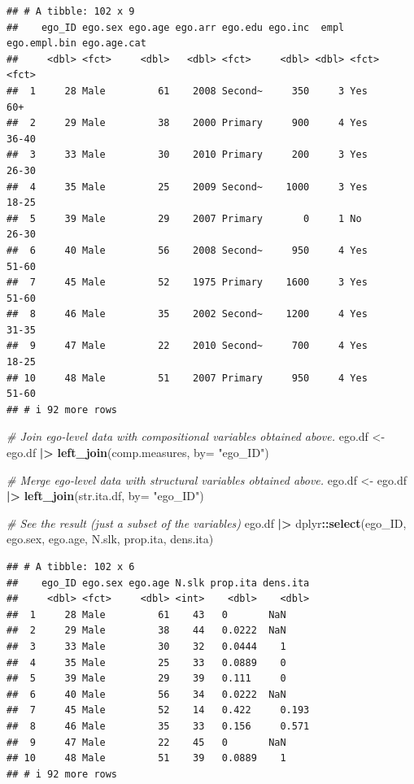 \documentclass[
]{book}
\newenvironment{Shaded}{\begin{snugshade}}{\end{snugshade}}
\newcommand{\AttributeTok}[1]{\textcolor[rgb]{0.13,0.29,0.53}{#1}}
\newcommand{\CommentTok}[1]{\textcolor[rgb]{0.56,0.35,0.01}{\textit{#1}}}
\newcommand{\FunctionTok}[1]{\textcolor[rgb]{0.13,0.29,0.53}{\textbf{#1}}}
\newcommand{\NormalTok}[1]{#1}
\newcommand{\OtherTok}[1]{\textcolor[rgb]{0.56,0.35,0.01}{#1}}
\newcommand{\SpecialCharTok}[1]{\textcolor[rgb]{0.81,0.36,0.00}{\textbf{#1}}}
\newcommand{\StringTok}[1]{\textcolor[rgb]{0.31,0.60,0.02}{#1}}
\begin{document}
\begin{verbatim}
## # A tibble: 102 x 9
##    ego_ID ego.sex ego.age ego.arr ego.edu ego.inc  empl ego.empl.bin ego.age.cat
##     <dbl> <fct>     <dbl>   <dbl> <fct>     <dbl> <dbl> <fct>        <fct>      
##  1     28 Male         61    2008 Second~     350     3 Yes          60+        
##  2     29 Male         38    2000 Primary     900     4 Yes          36-40      
##  3     33 Male         30    2010 Primary     200     3 Yes          26-30      
##  4     35 Male         25    2009 Second~    1000     3 Yes          18-25      
##  5     39 Male         29    2007 Primary       0     1 No           26-30      
##  6     40 Male         56    2008 Second~     950     4 Yes          51-60      
##  7     45 Male         52    1975 Primary    1600     3 Yes          51-60      
##  8     46 Male         35    2002 Second~    1200     4 Yes          31-35      
##  9     47 Male         22    2010 Second~     700     4 Yes          18-25      
## 10     48 Male         51    2007 Primary     950     4 Yes          51-60      
## # i 92 more rows
\end{verbatim}

\begin{Shaded}
\begin{Highlighting}[]
\CommentTok{\# Join ego{-}level data with compositional variables obtained above.}
\NormalTok{ego.df }\OtherTok{\textless{}{-}}\NormalTok{ ego.df }\SpecialCharTok{|\textgreater{}} 
  \FunctionTok{left\_join}\NormalTok{(comp.measures, }\AttributeTok{by=} \StringTok{"ego\_ID"}\NormalTok{)}

\CommentTok{\# Merge ego{-}level data with structural variables obtained above.}
\NormalTok{ego.df }\OtherTok{\textless{}{-}}\NormalTok{ ego.df }\SpecialCharTok{|\textgreater{}} 
  \FunctionTok{left\_join}\NormalTok{(str.ita.df, }\AttributeTok{by=} \StringTok{"ego\_ID"}\NormalTok{)}

\CommentTok{\# See the result (just a subset of the variables)}
\NormalTok{ego.df }\SpecialCharTok{|\textgreater{}} 
\NormalTok{  dplyr}\SpecialCharTok{::}\FunctionTok{select}\NormalTok{(ego\_ID, ego.sex, ego.age, N.slk, prop.ita, dens.ita)}
\end{Highlighting}
\end{Shaded}

\begin{verbatim}
## # A tibble: 102 x 6
##    ego_ID ego.sex ego.age N.slk prop.ita dens.ita
##     <dbl> <fct>     <dbl> <int>    <dbl>    <dbl>
##  1     28 Male         61    43   0       NaN    
##  2     29 Male         38    44   0.0222  NaN    
##  3     33 Male         30    32   0.0444    1    
##  4     35 Male         25    33   0.0889    0    
##  5     39 Male         29    39   0.111     0    
##  6     40 Male         56    34   0.0222  NaN    
##  7     45 Male         52    14   0.422     0.193
##  8     46 Male         35    33   0.156     0.571
##  9     47 Male         22    45   0       NaN    
## 10     48 Male         51    39   0.0889    1    
## # i 92 more rows
\end{verbatim}
\end{document}
